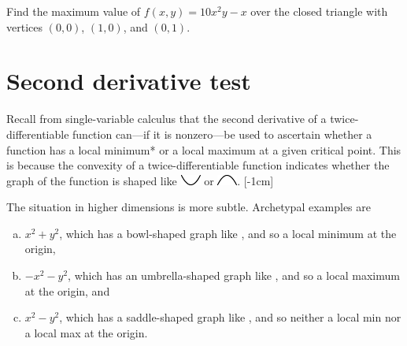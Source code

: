 \documentclass[prettycode,shellescape]{watsonbook}
\begin{document}
\begin{exercise}{}{}
  Find the maximum value of $f(x,y) = 10x^2y-x$ over the closed
  triangle with vertices $(0,0)$, $(1,0)$, and $(0,1)$.
\end{exercise}

\section{Second derivative test} \label{sec:second_test}

Recall from single-variable calculus that the second derivative of a
twice-differentiable function can---if it is nonzero---be used to
ascertain whether a function has a local minimum* or a local maximum
at a given critical point. This is because the convexity of a
twice-differentiable function indicates whether the graph of the
function is shaped like \includegraphics{figures/smallup} or
\includegraphics{figures/smalldown}. [-1cm]

The situation in higher dimensions is more subtle. Archetypal
examples are 
\begin{enumerate}[(a),topsep=-6pt,itemsep=4pt]
\item $x^2 + y^2$, which has a bowl-shaped graph like
  , and so a local
  minimum at the origin,
\item $-x^2 - y^2$, which has an umbrella-shaped graph like
  , and so a
  local maximum at the origin, and
\item $x^2 - y^2$, which has a saddle-shaped graph like
  , and so
  neither a local min nor a local max at the origin.
\end{enumerate}
\end{document}
